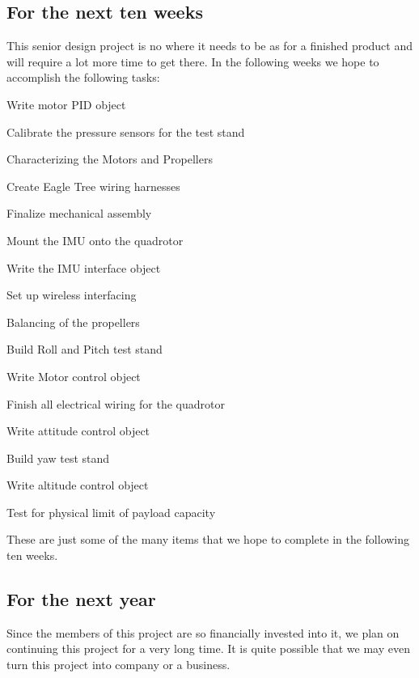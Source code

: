 \documentclass{article}
\numberwithin{equation}{section} %
\begin{document}
\subsection{For the next ten weeks} \label{subsec:maintenance_plan_10}
This senior design project is no where it needs to be as for a finished product and will require a lot more time to get there. In the following weeks we hope to accomplish the following tasks:

\begin{list}{*}{}
	\item Write motor PID object
	\item Calibrate the pressure sensors for the test stand
	\item Characterizing the Motors and Propellers
	\item Create Eagle Tree wiring harnesses
	\item Finalize mechanical assembly
	\item Mount the IMU onto the quadrotor
	\item Write the IMU interface object
	\item Set up wireless interfacing
	\item Balancing of the propellers
	\item Build Roll and Pitch test stand
	\item Write Motor control object
	\item Finish all electrical wiring for the quadrotor
	\item Write attitude control object
	\item Build yaw test stand
	\item Write altitude control object
	\item Test for physical limit of payload capacity
\end{list}
These are just some of the many items that we hope to complete in the following ten weeks.


\subsection{For the next year}
Since the members of this project are so financially invested into it, we plan on continuing this project for a very long time. It is quite possible that we may even turn this project into company or a business.
\end{document}
